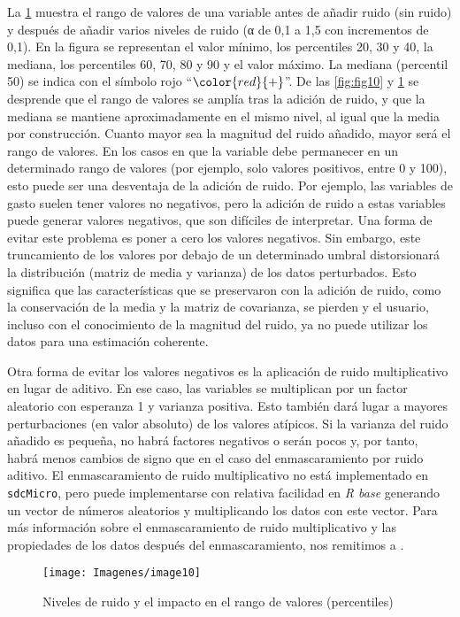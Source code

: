 \documentclass[
]{book}
\theoremstyle{definition}
\theoremstyle{definition}
\theoremstyle{definition}
\theoremstyle{definition}
\theoremstyle{remark}
\begin{document}
La \ref{fig:fig11} muestra el rango de valores de una variable antes de añadir ruido (sin ruido) y después de añadir varios niveles de ruido (α de 0,1 a 1,5 con incrementos de 0,1). En la figura se representan el valor mínimo, los percentiles 20, 30 y 40, la mediana, los percentiles 60, 70, 80 y 90 y el valor máximo. La mediana (percentil 50) se indica con el símbolo rojo ``\(\color {red}{\text{+}}\)''. De las \ref{fig:fig10} y \ref{fig:fig11} se desprende que el rango de valores se amplía tras la adición de ruido, y que la mediana se mantiene aproximadamente en el mismo nivel, al igual que la media por construcción. Cuanto mayor sea la magnitud del ruido añadido, mayor será el rango de valores. En los casos en que la variable debe permanecer en un determinado rango de valores (por ejemplo, solo valores positivos, entre 0 y 100), esto puede ser una desventaja de la adición de ruido. Por ejemplo, las variables de gasto suelen tener valores no negativos, pero la adición de ruido a estas variables puede generar valores negativos, que son difíciles de interpretar. Una forma de evitar este problema es poner a cero los valores negativos. Sin embargo, este truncamiento de los valores por debajo de un determinado umbral distorsionará la distribución (matriz de media y varianza) de los datos perturbados. Esto significa que las características que se preservaron con la adición de ruido, como la conservación de la media y la matriz de covarianza, se pierden y el usuario, incluso con el conocimiento de la magnitud del ruido, ya no puede utilizar los datos para una estimación coherente.

Otra forma de evitar los valores negativos es la aplicación de ruido multiplicativo en lugar de aditivo. En ese caso, las variables se multiplican por un factor aleatorio con esperanza 1 y varianza positiva. Esto también dará lugar a mayores perturbaciones (en valor absoluto) de los valores atípicos. Si la varianza del ruido añadido es pequeña, no habrá factores negativos o serán pocos y, por tanto, habrá menos cambios de signo que en el caso del enmascaramiento por ruido aditivo. El enmascaramiento de ruido multiplicativo no está implementado en \texttt{sdcMicro}, pero puede implementarse con relativa facilidad en \emph{R base} generando un vector de números aleatorios y multiplicando los datos con este vector. Para más información sobre el enmascaramiento de ruido multiplicativo y las propiedades de los datos después del enmascaramiento, nos remitimos a \citep{KiWi03}.

\begin{figure}
\texttt{[image: Imagenes/image10]} \caption{Niveles de ruido y el impacto en el rango de valores (percentiles)}\label{fig:fig11}
\end{figure}
\end{document}
